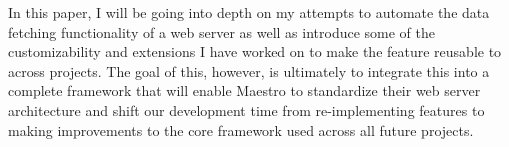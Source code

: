In this paper, I will be going into depth on my attempts to automate the data fetching functionality of a web server as well as introduce some of the customizability and extensions I have worked on to make the feature reusable to across projects.  The goal of this, however, is ultimately to integrate this into a complete framework that will enable Maestro to standardize their web server architecture and shift our development time from re-implementing features to making improvements to the core framework used across all future projects. 